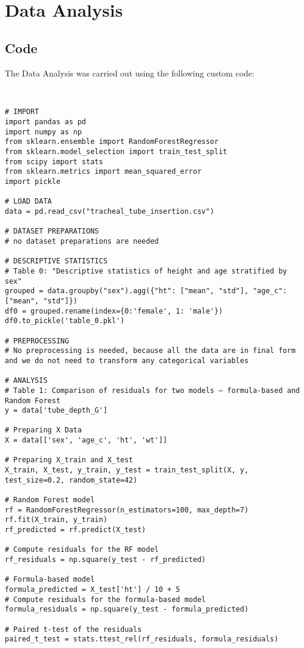 \documentclass[11pt]{article}
\begin{document}
\section{Data Analysis}
\subsection{{Code}}
The Data Analysis was carried out using the following custom code:

\begin{verbatim}


# IMPORT
import pandas as pd
import numpy as np
from sklearn.ensemble import RandomForestRegressor
from sklearn.model_selection import train_test_split
from scipy import stats
from sklearn.metrics import mean_squared_error
import pickle

# LOAD DATA
data = pd.read_csv("tracheal_tube_insertion.csv")

# DATASET PREPARATIONS
# no dataset preparations are needed

# DESCRIPTIVE STATISTICS
# Table 0: "Descriptive statistics of height and age stratified by sex"
grouped = data.groupby("sex").agg({"ht": ["mean", "std"], "age_c": ["mean", "std"]})
df0 = grouped.rename(index={0:'female', 1: 'male'})
df0.to_pickle('table_0.pkl')

# PREPROCESSING
# No preprocessing is needed, because all the data are in final form and we do not need to transform any categorical variables

# ANALYSIS
# Table 1: Comparison of residuals for two models – formula-based and Random Forest
y = data['tube_depth_G']

# Preparing X Data
X = data[['sex', 'age_c', 'ht', 'wt']]

# Preparing X_train and X_test
X_train, X_test, y_train, y_test = train_test_split(X, y, test_size=0.2, random_state=42)

# Random Forest model
rf = RandomForestRegressor(n_estimators=100, max_depth=7)
rf.fit(X_train, y_train)
rf_predicted = rf.predict(X_test)

# Compute residuals for the RF model
rf_residuals = np.square(y_test - rf_predicted)

# Formula-based model
formula_predicted = X_test['ht'] / 10 + 5
# Compute residuals for the formula-based model
formula_residuals = np.square(y_test - formula_predicted)

# Paired t-test of the residuals
paired_t_test = stats.ttest_rel(rf_residuals, formula_residuals)


\end{verbatim}
\end{document}
